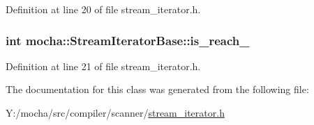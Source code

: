 Definition at line 20 of file stream\_\-iterator.h.

\hypertarget{classmocha_1_1_stream_iterator_base_a841ac33532a6c401889af7a6b24135a9}{
\subsubsection[{is\_\-reach\_\-}]{\setlength{\rightskip}{0pt plus 5cm}int {\bf mocha::StreamIteratorBase::is\_\-reach\_\-}}}
\label{classmocha_1_1_stream_iterator_base_a841ac33532a6c401889af7a6b24135a9}


Definition at line 21 of file stream\_\-iterator.h.



The documentation for this class was generated from the following file:\begin{DoxyCompactItemize}
\item 
Y:/mocha/src/compiler/scanner/\hyperlink{stream__iterator_8h}{stream\_\-iterator.h}\end{DoxyCompactItemize}

